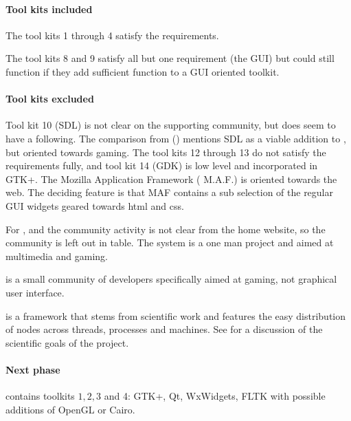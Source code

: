 \paragraph{Tool kits included} The tool kits 1 through 4 satisfy the
requirements.  

The tool kits 8 and 9 satisfy all but one requirement (the GUI) but could still
function if they add sufficient function to a GUI oriented toolkit. 

\paragraph{Tool kits excluded} Tool kit 10 ({\sf SDL}) is not clear on the
supporting community, but does seem to have a following.  The comparison from
 (\cite{wxwidget:comparison}) mentions {\sf SDL} as a viable
addition to , but oriented towards gaming. The tool kits 12
through 13 do not satisfy the requirements fully, and tool kit 14 (GDK) is low
level and incorporated in {\sf GTK+}.  The Mozilla Application Framework ({\sf
M.A.F.}) is oriented towards the web. The deciding feature is that {\sf MAF}
contains a sub selection of the regular GUI widgets geared towards html and
css.

For ,  and  the community activity is not clear from
the home website, so the community is left out in table. The system  is
a one man project and aimed at multimedia and gaming. 

 is a small community of developers specifically aimed at gaming, not graphical
user interface.

 is a framework that stems from scientific work and features the easy
distribution of nodes across threads, processes and machines.  See
\cite{greed:gled} for a discussion of the scientific goals of the 
project.

\paragraph{Next phase} contains toolkits $1, 2, 3$ and 4: {\sf GTK+, Qt,
WxWidgets, FLTK} with possible additions of OpenGL or Cairo. 

